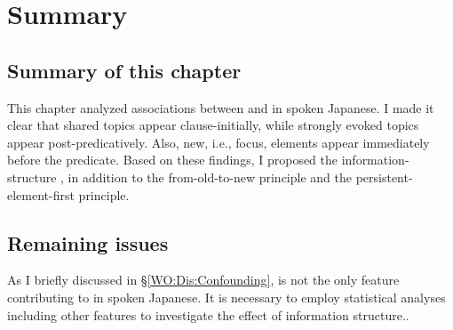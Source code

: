 






\section{Summary}

\subsection{Summary of this chapter}

This chapter analyzed associations between  and  in spoken Japanese.
I made it clear that
shared topics appear clause-initially,
while strongly evoked topics appear post-predicatively.
Also, new, i.e., focus, elements appear immediately before the predicate.
Based on these findings,
I proposed the information-structure ,
in addition to the from-old-to-new principle and the persistent-element-first principle.


\subsection{Remaining issues}

As I briefly discussed in \S \ref{WO:Dis:Confounding},
 is not the only feature contributing to  in spoken Japanese.
It is necessary to employ statistical analyses including other features to investigate the effect of information structure..











